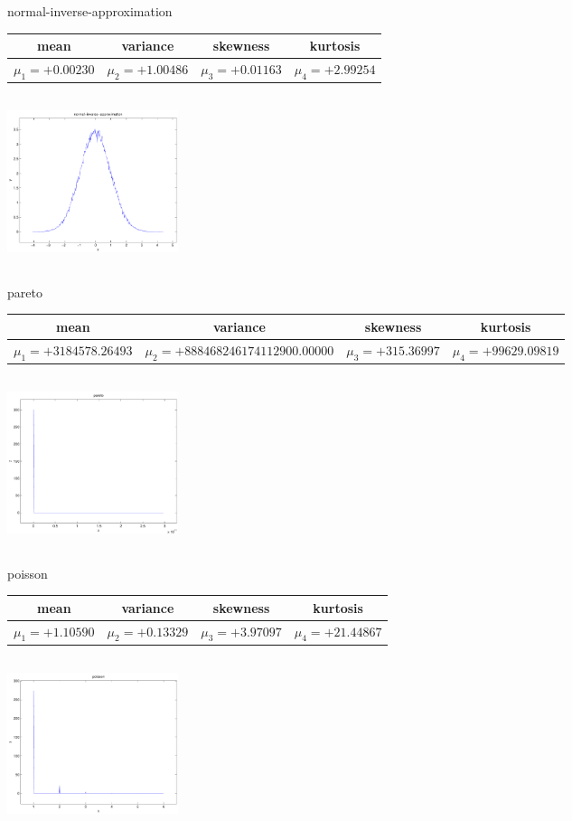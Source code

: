 \documentclass[9pt]{article}
\theoremstyle{plain}
\theoremstyle{definition}
\theoremstyle{remark}
\numberwithin{equation}{section}
\begin{document}
\newpage
normal-inverse-approximation \begin{tabular}{|c|c|c|c|}  mean & variance & skewness & kurtosis \\  \hline
$\mu_1 = +0.00230$ & $\mu_2 = +1.00486$ & $\mu_3 = +0.01163$ & $\mu_4 =+2.99254$ \\
\end{tabular}

\includegraphics[width=5cm,height=5cm]{normal-inverse-approximation.pdf}

pareto \begin{tabular}{|c|c|c|c|}  mean & variance & skewness & kurtosis \\  \hline
$\mu_1 = +3184578.26493$ & $\mu_2 = +888468246174112900.00000$ & $\mu_3 = +315.36997$ & $\mu_4 =+99629.09819$ \\
\end{tabular}

\includegraphics[width=5cm,height=5cm]{pareto.pdf}

poisson \begin{tabular}{|c|c|c|c|}  mean & variance & skewness & kurtosis \\  \hline
$\mu_1 = +1.10590$ & $\mu_2 = +0.13329$ & $\mu_3 = +3.97097$ & $\mu_4 =+21.44867$ \\
\end{tabular}

\includegraphics[width=5cm,height=5cm]{poisson.pdf}
\end{document}
